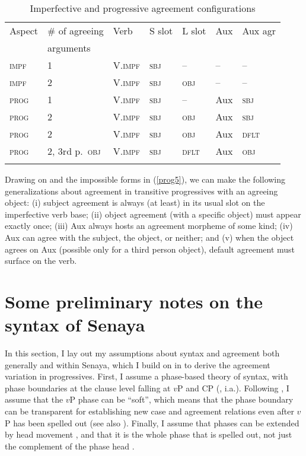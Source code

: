 \documentclass[output=paper
,modfonts
,nonflat]{langsci/langscibook}
\begin{document}
\begin{table}
\caption{Imperfective and progressive agreement configurations}
\label{tab-kalin:2}
\begin{tabularx}{\textwidth}{XlXXXXX}
\lsptoprule Aspect & \# of agreeing & Verb & S slot & L slot & Aux & Aux agr  \\
& arguments & & & & & \\
\midrule
  \textsc{impf} & 1 & V.\textsc{impf} & \scshape sbj & -- & -- & -- \\
  \textsc{impf} & 2 & V.\textsc{impf} & \scshape sbj & \scshape obj & -- & -- \\
  \textsc{prog} & 1 & V.\textsc{impf} & \scshape sbj & -- & Aux           & \scshape sbj \\
 \textsc{prog}  & 2  & V.\textsc{impf}& \scshape sbj & \scshape obj & Aux & \scshape sbj\\
  \textsc{prog} & 2 & V.\textsc{impf} & \scshape sbj & \scshape obj & Aux & \scshape dflt \\
  \textsc{prog} & 2, 3rd p.\ \textsc{obj} & V.\textsc{impf}& \textsc{sbj} & \textsc{dflt} & Aux& \textsc{obj} \\
  	\lspbottomrule
 \end{tabularx}
\end{table}

\noindent Drawing on  and the impossible forms in (\ref{prog5}), we can make the following generalizations about agreement in transitive progressives with an agreeing object: (i) subject agreement is always (at least) in its usual slot on the imperfective verb base; (ii) object agreement (with a specific object) must appear exactly once; (iii) Aux always hosts an agreement morpheme of some kind; (iv) Aux can agree with the subject, the object, or neither; and (v) when the object agrees on Aux (possible only for a third person object), default agreement must surface on the verb.

\section{Some preliminary notes on the syntax of Senaya} \label{sec-kalin:3}

In this section, I lay out my assumptions about syntax and agreement both generally and within Senaya, which I build on in  to derive the agreement variation in progressives. First, I assume a phase-based theory of syntax, with phase boundaries at the clause level falling at $v$P and CP (\citealt{Chomsky01}, i.a.). Following \citet{Baker15}, I assume that the $v$P phase can be ``soft'', which means that the phase boundary can be transparent for establishing new case and agreement relations even after $v$P has been spelled out (see also ). Finally, I assume that phases can be extended by head movement \citep{denDikken06,denDikken07,Gallego10}, and that it is the whole phase that is spelled out, not just the complement of the phase head \citep{FP05}.
\end{document}
